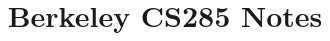 \documentclass{article}
\begin{document}
\title{Berkeley CS285 Notes}
\author{}
\date{}
\maketitle{}          %


\renewcommand{\contentsname}{\centering Contents}
\tableofcontents{}    %





\newpage{}
\printbibliography

\end{document}

